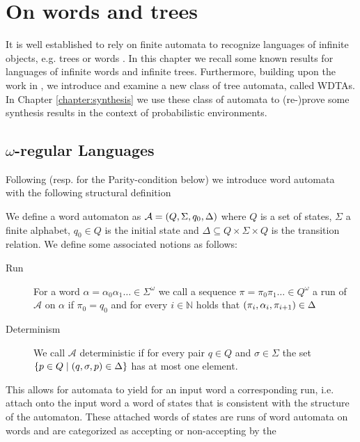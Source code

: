 \chapter{On words and trees}
It is well established to rely on finite automata to recognize languages of
infinite objects, e.g. trees or words \cite{LangAutoLog}. In this chapter we
recall some known results for languages of infinite words and infinite trees.
Furthermore, building upon the work in \cite{RandAutoInfTrees}, we introduce
and examine a new class of tree automata, called \aclp{WDTA}. In Chapter
\ref{chapter:synthesis} we use these class of automata to (re-)prove some
synthesis results in the context of probabilistic environments.

\section{$\omega$-regular Languages}
\label{sec:wordautomata}
Following \cite{LangAutoLog} (resp. \cite[Chapter 1]{AutoLogInfGames} for the
Parity-condition below) we introduce word automata with the following
structural definition
\begin{definition}
  We define a word automaton as
  $\mathcal{A} = \left(Q, \Sigma, q_{0}, \Delta\right)$ where
  $Q$ is a set of states, $\Sigma$ a finite alphabet, $q_{0}\in Q$ is the
  initial state and $\Delta\subseteq Q\times\Sigma\times Q$ is the transition
  relation. We define some associated notions as follows:
  \begin{description}
    \item [Run]
      For a word $\alpha = \alpha_{0}\alpha_{1}\dots\in\Sigma^{\omega}$ we call
      a sequence $\pi = \pi_{0}\pi_{1}\dots \in Q^{\omega}$ a run of
      $\mathcal{A}$ on $\alpha$ if $\pi_{0} = q_{0}$ and for every
      $i\in\mathbb{N}$ holds that
      $\left(\pi_{i}, \alpha_{i}, \pi_{i+1}\right)\in\Delta$
    \item [Determinism]
      We call $\mathcal{A}$ deterministic if for every pair $q\in Q$ and
      $\sigma\in\Sigma$ the set
      $\left\{p\in Q\mid\left(q,\sigma,p\right)\in\Delta\right\}$ has at most one
      element.
  \end{description}
\end{definition}
This allows for automata to yield for an input word a corresponding run, i.e.
attach onto the input word a word of states that is consistent with the
structure of the automaton. These attached words of states are runs of word
automata on words and are categorized as accepting or non-accepting by the
